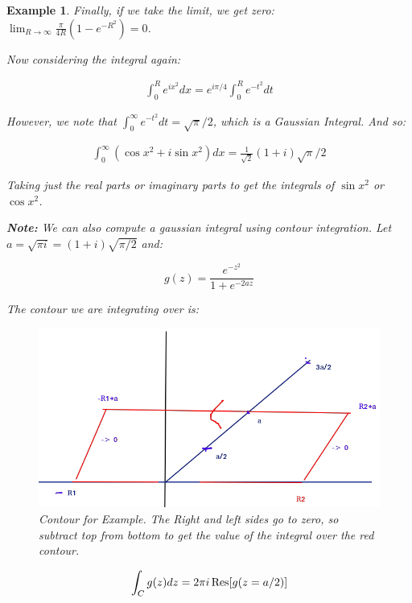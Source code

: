 \documentclass{article}
\newtheorem{ex}{Example}
\theoremstyle{definition}
\begin{document}
\begin{ex}
Finally, if we take the limit, we get zero: $\lim_{R\to \infty } \frac{\pi}{4R}(1-e^{-R^2}) = 0$.


Now considering the integral again:

\begin{align*}
\int_0^R e^{ix^2} dx = e^{i\pi/4}  \int_0^R e^{-t^2} dt
\end{align*}

However, we note that $\int_0^\infty e^{-t^2} dt = \sqrt{\pi}/2$, which is a \textit{Gaussian Integral.}
And so:

\begin{align*}
\int_{0}^{\infty} (\cos x^2 + i \sin x^2  )dx = \frac{1}{\sqrt{2}} (1+i)\sqrt{\pi}/2
\end{align*}

Taking just the real parts or imaginary parts to get the integrals of $\sin x^2$ or $\cos x^2$. 

\textbf{Note:} We can also compute a \textit{gaussian integral} using contour integration. Let $a=\sqrt{\pi i} = (1+i) \sqrt{\pi/2}$ and:

$$g(z) = \frac{e^{-z^2}}{1+e^{-2az}}$$

The contour we are integrating over is: 
\begin{figure}[H]
	\centering
	\includegraphics[width=0.7\linewidth]{box_c}
	\caption{Contour for Example. The Right and left sides go to zero, so subtract top from bottom to get the value of the integral over the red contour.}
	\label{fig:boxc}
\end{figure}

\begin{align*}
\int_C g(z) dz = 2\pi i \Res[g(z=a/2)]
\end{align*}
\end{ex}
\end{document}

